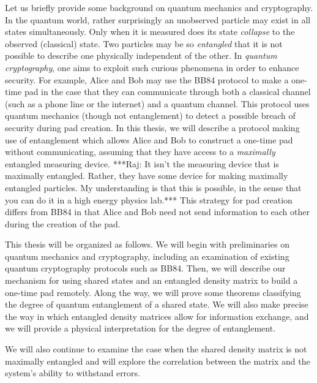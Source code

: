 Let us briefly provide some background on quantum mechanics and cryptography.  In the quantum world, rather surprisingly an unobserved particle may exist in all states simultaneously.  Only when it is measured does its state {\emph{collapse}} to the observed (classical) state.  Two particles may be so {\emph{entangled}} that it is not possible to describe one physically independent of the other.  In {\emph{quantum cryptography}}, one aims to exploit such curious phenomena in order to enhance security.  For example, Alice and Bob may use the BB84 protocol to make a one-time pad in the case that they can communicate through both a classical channel (such as a phone line or the internet) and a quantum channel. This protocol uses quantum mechanics (though not entanglement) to detect a possible breach of security during pad creation.  In this thesis, we will describe a protocol making use of entanglement which allows Alice and Bob to construct a one-time pad without communicating, assuming that they have access to a {\emph{maximally}} entangled measuring device.  ***Raj: It isn't the measuring device that is maximally entangled. Rather, they have some device for making maximally entangled particles. My understanding is that this is possible, in the sense that you can do it in a high energy physics lab.*** This strategy for pad creation differs from BB84 in that Alice and Bob need not send information to each other during the creation of the pad.

This thesis will be organized as follows.  We will begin with preliminaries on quantum mechanics and cryptography, including an examination of existing quantum cryptography protocols such as BB84. Then, we will describe our mechanism for using shared states and an entangled density matrix to build a one-time pad remotely. Along the way, we will prove some theorems classifying the degree of quantum entanglement of a shared state. We will also make precise the way in which entangled density matrices allow for information exchange, and we will provide a physical interpretation for the degree of entanglement. 

We will also continue to examine the case when the shared density matrix is not maximally entangled and will explore the correlation between the matrix and the system's ability to withstand errors. 
